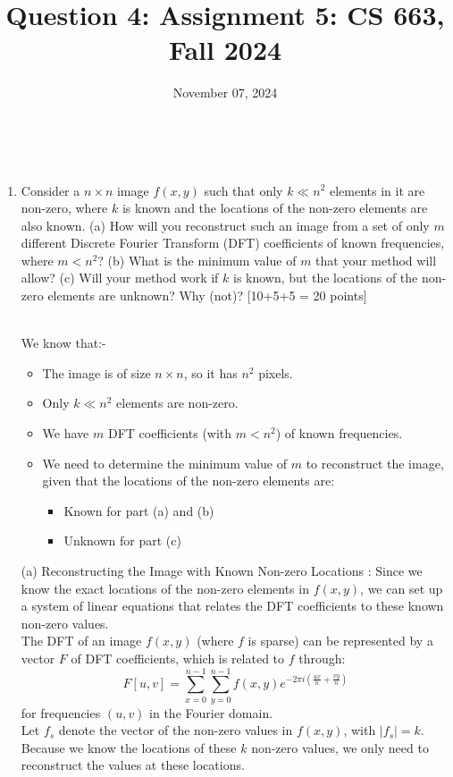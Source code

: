 \documentclass{article}
\title{Question 4: Assignment 5: CS 663, Fall 2024}
\author{
\IEEEauthorblockN{
    \begin{tabular}{cccc}
        \begin{minipage}[t]{0.23\textwidth}
            \centering
            Amitesh Shekhar\\
            IIT Bombay\\
            22b0014@iitb.ac.in
        \end{minipage} & 
        \begin{minipage}[t]{0.23\textwidth}
            \centering
            Anupam Rawat\\
            IIT Bombay\\
            22b3982@iitb.ac.in
        \end{minipage} & 
        \begin{minipage}[t]{0.23\textwidth}
            \centering
            Toshan Achintya Golla\\
            IIT Bombay\\
            22b2234@iitb.ac.in
        \end{minipage} \\
        \\ 
    \end{tabular}
}
}
\date{November 07, 2024}
\begin{document}
\maketitle

\\

\begin{enumerate}
\item Consider a $n \times n$ image $f(x,y)$ such that only $k \ll n^2$ elements in it are non-zero, where $k$ is known and the locations of the non-zero elements are also known. (a) How will you reconstruct such an image from a set of only $m$ different Discrete Fourier Transform (DFT) coefficients of known frequencies, where $m < n^2$? (b) What is the minimum value of $m$ that your method will allow? (c) Will your method work if $k$ is known, but the locations of the non-zero elements are unknown? Why (not)? \textsf{[10+5+5 = 20 points]}

\\ We know that:-
\begin{itemize}
    \item The image is of size \( n \times n \), so it has \( n^2 \) pixels.
    \item Only \( k \ll n^2 \) elements are non-zero.
    \item We have \( m \) DFT coefficients (with \( m < n^2 \)) of known frequencies.
    \item We need to determine the minimum value of \( m \) to reconstruct the image, given that the locations of the non-zero elements are:
    \begin{itemize}
        \item Known for part (a) and (b)
        \item Unknown for part (c)
    \end{itemize}
\end{itemize}

(a) Reconstructing the Image with Known Non-zero Locations : Since we know the exact locations of the non-zero elements in \( f(x, y) \), we can set up a system of linear equations that relates the DFT coefficients to these known non-zero values.
\\
The DFT of an image \( f(x, y) \) (where \( f \) is sparse) can be represented by a vector \( {F} \) of DFT coefficients, which is related to \( f \) through:
\[
{F}[u, v] = \sum_{x=0}^{n-1} \sum_{y=0}^{n-1} f(x, y) e^{-2\pi i \left( \frac{ux}{n} + \frac{vy}{n} \right)}
\]
for frequencies \( (u, v) \) in the Fourier domain.
\\
Let \( f_s \) denote the vector of the non-zero values in \( f(x, y) \), with \( |f_s| = k \). Because we know the locations of these \( k \) non-zero values, we only need to reconstruct the values at these locations.


\end{enumerate}
\end{document}
